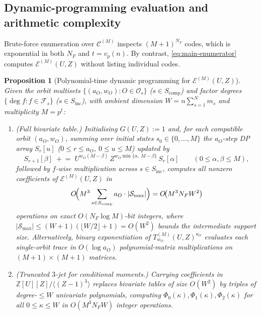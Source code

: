 \documentclass[preprint,12pt]{elsarticle}
\newcommand{\Z}{\mathbb Z}
\newcommand{\Fs}{\mathcal F_s}
\newcommand{\Os}{\mathcal O_s}
\newcommand{\Epoly}{\mathscr E}
\numberwithin{equation}{section}
\theoremstyle{plain}
\newtheorem{proposition}[theorem]{Proposition}
\theoremstyle{definition}
\theoremstyle{remark}
\begin{document}
\subsection{Dynamic-programming evaluation and arithmetic complexity}\label{sec:algorithm}

Brute-force enumeration over $\mathscr C^{(M)}$ inspects $(M+1)^{N_F}$ codes,
which is exponential in both $N_F$ and $t=v_p(n)$. By contrast,
\eqref{eq:main-enumerator} computes $\Epoly^{(M)}(U,Z)$ without listing individual
codes.

\begin{proposition}[Polynomial-time dynamic programming for $\Epoly^{(M)}(U,Z)$]\label{prop:algorithm}
Given the orbit multisets $\{(a_O,w_O):O\in\Os\}$ ($s\in S_{\mathrm{comp}}$) and
factor degrees $\{\deg f:f\in\Fs\}$ ($s\in S_{\mathrm{inc}}$), with ambient
dimension $W=n\sum_{s=1}^{N}m_s$ and multiplicity $M=p^t$:
\begin{enumerate}
\item[\textup{(a)}] \emph{(Full bivariate table.)} Initialising $G(U,Z):=1$ and,
for each compatible orbit $(a_O,w_O)$, summing over initial states
$s_0\in\{0,\dots,M\}$ the $a_O$-step DP array $S_r[u]$ ($0\le r\le a_O$,
$0\le u\le M$) updated by
\[
S_{r+1}[\beta]\;\mathrel{+}=\;
 U^{w_O(M-\beta)}\,Z^{w_O\min\{\alpha,\,M-\beta\}}\,S_r[\alpha]
 \qquad(0\le\alpha,\beta\le M),
\]
followed by $f$-wise multiplication across $s\in S_{\mathrm{inc}}$, computes all
nonzero coefficients of $\Epoly^{(M)}(U,Z)$ in
\begin{equation}\label{eq:dp-complexity}
O\!\Bigl(M^3\sum_{s\in S_{\mathrm{comp}}} a_O\cdot |\mathcal S_{\max}|\Bigr)
 =O\!\bigl(M^3 N_F W^2\bigr)
\end{equation}
operations on exact $O(N_F\log M)$-bit integers, where
$|\mathcal S_{\max}|\le(W+1)(\lfloor W/2\rfloor+1)=O(W^2)$ bounds the intermediate
support size. Alternatively, binary exponentiation of $T_{w_O}^{(M)}(U,Z)^{a_O}$
evaluates each single-orbit trace in $O(\log a_O)$ polynomial-matrix multiplications
on $(M+1)\times(M+1)$ matrices.
\item[\textup{(b)}] \emph{(Truncated $3$-jet for conditional moments.)} Carrying
coefficients in $\Z[U][Z]/\langle(Z-1)^3\rangle$ replaces bivariate tables of size
$O(W^2)$ by triples of degree-$\le W$ univariate polynomials, computing
$\Phi_0(\kappa),\Phi_1(\kappa),\Phi_2(\kappa)$ for all $0\le\kappa\le W$ in
$O(M^3 N_F W)$ integer operations.
\end{enumerate}
\end{proposition}
\end{document}

